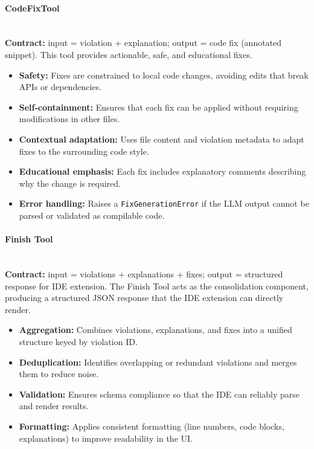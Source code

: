 \begin{spacing}{1.2}
\paragraph{CodeFixTool}\\
\textbf{Contract:} input = violation + explanation; output = code fix (annotated snippet).  
This tool provides actionable, safe, and educational fixes.
\begin{itemize}
    \item \textbf{Safety:} Fixes are constrained to local code changes, avoiding edits that break APIs or dependencies.
    \item \textbf{Self-containment:} Ensures that each fix can be applied without requiring modifications in other files.
    \item \textbf{Contextual adaptation:} Uses file content and violation metadata to adapt fixes to the surrounding code style.
    \item \textbf{Educational emphasis:} Each fix includes explanatory comments describing why the change is required.
    \item \textbf{Error handling:} Raises a \texttt{FixGenerationError} if the LLM output cannot be parsed or validated as compilable code.
\end{itemize}

\paragraph{Finish Tool}\\
\textbf{Contract:} input = violations + explanations + fixes; output = structured response for IDE extension.  
The Finish Tool acts as the consolidation component, producing a structured JSON response that the IDE extension can directly render.
\begin{itemize}
    \item \textbf{Aggregation:} Combines violations, explanations, and fixes into a unified structure keyed by violation ID.
    \item \textbf{Deduplication:} Identifies overlapping or redundant violations and merges them to reduce noise.
    \item \textbf{Validation:} Ensures schema compliance so that the IDE can reliably parse and render results.
    \item \textbf{Formatting:} Applies consistent formatting (line numbers, code blocks, explanations) to improve readability in the UI.
\end{itemize}


\end{spacing}
